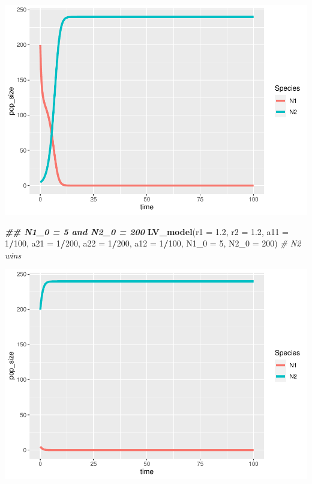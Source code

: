 \documentclass[
]{book}
\newenvironment{Shaded}{\begin{snugshade}}{\end{snugshade}}
\newcommand{\AttributeTok}[1]{\textcolor[rgb]{0.13,0.29,0.53}{#1}}
\newcommand{\CommentTok}[1]{\textcolor[rgb]{0.56,0.35,0.01}{\textit{#1}}}
\newcommand{\DecValTok}[1]{\textcolor[rgb]{0.00,0.00,0.81}{#1}}
\newcommand{\DocumentationTok}[1]{\textcolor[rgb]{0.56,0.35,0.01}{\textbf{\textit{#1}}}}
\newcommand{\FloatTok}[1]{\textcolor[rgb]{0.00,0.00,0.81}{#1}}
\newcommand{\FunctionTok}[1]{\textcolor[rgb]{0.13,0.29,0.53}{\textbf{#1}}}
\newcommand{\NormalTok}[1]{#1}
\newcommand{\SpecialCharTok}[1]{\textcolor[rgb]{0.81,0.36,0.00}{\textbf{#1}}}
\begin{document}
\includegraphics{bookdown-demo_files/figure-latex/unnamed-chunk-21-3.pdf}

\begin{Shaded}
\begin{Highlighting}[]
  \DocumentationTok{\#\# N1\_0 = 5 and N2\_0 = 200}
  \FunctionTok{LV\_model}\NormalTok{(}\AttributeTok{r1 =} \FloatTok{1.2}\NormalTok{, }\AttributeTok{r2 =} \FloatTok{1.2}\NormalTok{, }\AttributeTok{a11 =} \DecValTok{1}\SpecialCharTok{/}\DecValTok{100}\NormalTok{, }\AttributeTok{a21 =} \DecValTok{1}\SpecialCharTok{/}\DecValTok{200}\NormalTok{, }\AttributeTok{a22 =} \DecValTok{1}\SpecialCharTok{/}\DecValTok{200}\NormalTok{, }\AttributeTok{a12 =} \DecValTok{1}\SpecialCharTok{/}\DecValTok{100}\NormalTok{, }\AttributeTok{N1\_0 =} \DecValTok{5}\NormalTok{, }\AttributeTok{N2\_0 =} \DecValTok{200}\NormalTok{)  }\CommentTok{\# N2 wins}
\end{Highlighting}
\end{Shaded}

\includegraphics{bookdown-demo_files/figure-latex/unnamed-chunk-21-4.pdf}
\end{document}
